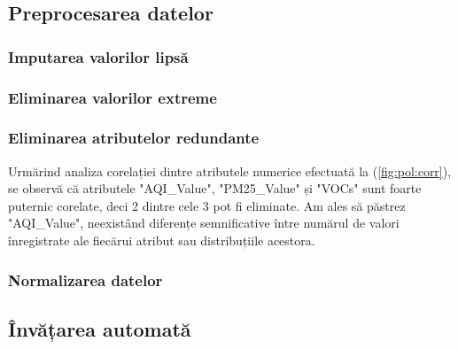 \documentclass{article}
\begin{document}
\subsection{Preprocesarea datelor}
\subsubsection{Imputarea valorilor lipsă}

\subsubsection{Eliminarea valorilor extreme}

\subsubsection{Eliminarea atributelor redundante}

Urmărind analiza corelației dintre atributele numerice efectuată la 
(\ref{fig:pol:corr}), se observă că atributele "AQI\_Value", "PM25\_Value" și 
"VOCs" sunt foarte puternic corelate, deci 2 dintre cele 3 pot fi eliminate. Am
ales să păstrez "AQI\_Value", neexistând diferențe semnificative între numărul 
de valori înregistrate ale fiecărui atribut sau distribuțiile acestora.

\subsubsection{Normalizarea datelor}

\subsection{Învățarea automată}
\end{document}
